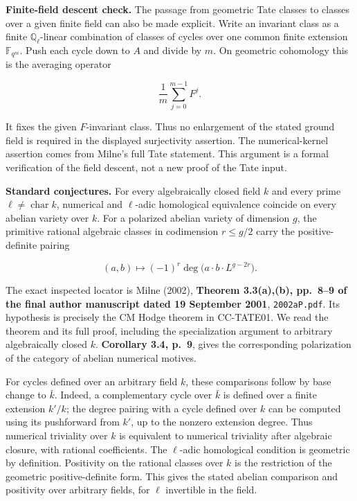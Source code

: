 \textbf{Finite-field descent check.} The passage from geometric Tate
classes to classes over a given finite field can also be made explicit.
Write an invariant class as a finite \(\mathbb Q_\ell\)-linear
combination of classes of cycles over one common finite extension
\(\mathbb F_{q^m}\). Push each cycle down to \(A\) and divide by \(m\).
On geometric cohomology this is the averaging operator

\[
\frac1m\sum_{j=0}^{m-1}F^j.
\]

It fixes the given \(F\)-invariant class. Thus no enlargement of the
stated ground field is required in the displayed surjectivity assertion.
The numerical-kernel assertion comes from Milne's full Tate statement.
This argument is a formal verification of the field descent, not a new
proof of the Tate input.

\textbf{Standard conjectures.} For every algebraically closed field
\(k\) and every prime \(\ell\ne\operatorname{char}k\), numerical and
\(\ell\)-adic homological equivalence coincide on every abelian variety
over \(k\). For a polarized abelian variety of dimension \(g\), the
primitive rational algebraic classes in codimension \(r\le g/2\) carry
the positive-definite pairing

\[
(a,b)\longmapsto(-1)^r\deg\bigl(a\cdot b\cdot L^{g-2r}\bigr).
\]

The exact inspected locator is Milne (2002), \textbf{Theorem 3.3(a),(b),
pp.~8--9 of the final author manuscript dated 19 September 2001},
\texttt{2002aP.pdf}. Its hypothesis is precisely the CM Hodge theorem in
CC-TATE01. We read the theorem and its full proof, including the
specialization argument to arbitrary algebraically closed \(k\).
\textbf{Corollary 3.4, p.~9}, gives the corresponding polarization of
the category of abelian numerical motives.

For cycles defined over an arbitrary field \(k\), these comparisons
follow by base change to \(\bar k\). Indeed, a complementary cycle over
\(\bar k\) is defined over a finite extension \(k'/k\); the degree
pairing with a cycle defined over \(k\) can be computed using its
pushforward from \(k'\), up to the nonzero extension degree. Thus
numerical triviality over \(k\) is equivalent to numerical triviality
after algebraic closure, with rational coefficients. The \(\ell\)-adic
homological condition is geometric by definition. Positivity on the
rational classes over \(k\) is the restriction of the geometric
positive-definite form. This gives the stated abelian comparison and
positivity over arbitrary fields, for \(\ell\) invertible in the field.

